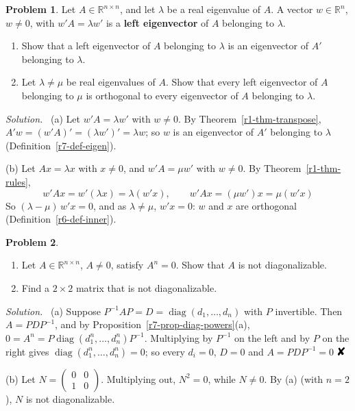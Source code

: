 \documentclass[12pt]{article}
\newcommand{\R}{\mathbb R}
\newcommand{\contradiction}{\mathord{\text{\large\ding{56}}}}
\DeclareMathOperator{\diag}{diag}
\theoremstyle{definition}
\newtheorem{problem}{Problem}
\newenvironment{solution}{\par\noindent\textit{Solution.}\ }{\par\smallskip}
\begin{document}
\begin{problem}\label{r7-pr-left}
Let \(A\in\R^{n\times n}\), and let \(\lambda\) be a real eigenvalue of \(A\). A vector \(w\in\R^n\), \(w\ne0\), with
\(w'A=\lambda w'\) is a \textbf{left eigenvector} of \(A\) belonging to \(\lambda\).
\begin{enumerate}
\item Show that a left eigenvector of \(A\) belonging to \(\lambda\) is an eigenvector of \(A'\) belonging to \(\lambda\).
\item Let \(\lambda\ne\mu\) be real eigenvalues of \(A\). Show that every left eigenvector of \(A\) belonging to \(\mu\) is
orthogonal to every eigenvector of \(A\) belonging to \(\lambda\).
\end{enumerate}
\end{problem}
\begin{solution}
(a) Let \(w'A=\lambda w'\) with \(w\ne0\). By Theorem~\ref{r1-thm-transpose}, \(A'w=(w'A)'=(\lambda w')'=\lambda w\); so
\(w\) is an eigenvector of \(A'\) belonging to \(\lambda\) (Definition~\ref{r7-def-eigen}).

(b) Let \(Ax=\lambda x\) with \(x\ne0\), and \(w'A=\mu w'\) with \(w\ne0\). By Theorem~\ref{r1-thm-rules},
\[
w'Ax=w'(\lambda x)=\lambda(w'x),\qquad w'Ax=(\mu w')x=\mu(w'x)
\]
So \((\lambda-\mu)\,w'x=0\), and as \(\lambda\ne\mu\), \(w'x=0\): \(w\) and \(x\) are orthogonal
(Definition~\ref{r6-def-inner}).
\end{solution}

\begin{problem}\label{r7-ex-nilpotent}
\begin{enumerate}
\item Let \(A\in\R^{n\times n}\), \(A\ne0\), satisfy \(A^n=0\). Show that \(A\) is not diagonalizable.
\item Find a \(2\times2\) matrix that is not diagonalizable.
\end{enumerate}
\end{problem}
\begin{solution}
(a) Suppose \(P^{-1}AP=D=\diag(d_1,\dots,d_n)\) with \(P\) invertible. Then \(A=PDP^{-1}\), and by
Proposition~\ref{r7-prop-diag-powers}(a), \(0=A^n=P\diag(d_1^n,\dots,d_n^n)P^{-1}\). Multiplying by \(P^{-1}\) on the left and
by \(P\) on the right gives \(\diag(d_1^n,\dots,d_n^n)=0\); so every \(d_i=0\), \(D=0\) and \(A=PDP^{-1}=0\)
\(\contradiction\)

(b) Let \(N=\begin{pmatrix}0&0\\1&0\end{pmatrix}\). Multiplying out, \(N^2=0\), while \(N\ne0\). By (a) (with \(n=2\)),
\(N\) is not diagonalizable.
\end{solution}
\end{document}
